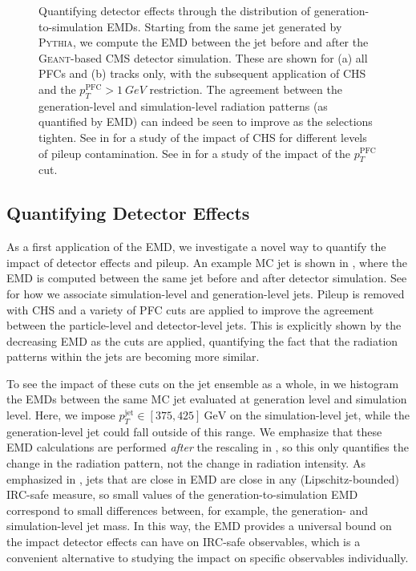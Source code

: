 \documentclass[aps,prd,twocolumn,preprintnumbers,nofootinbib,longbibliography,floatfix,superscriptaddress]{revtex4-1}
\begin{document}
\begin{figure*}[t]
  \caption{
Quantifying detector effects through the distribution of generation-to-simulation EMDs.
%
Starting from the same jet generated by \textsc{Pythia}, we compute the EMD between the jet before and after the \textsc{Geant}-based CMS detector simulation.
%
These are shown for (a) all PFCs and (b) tracks only, with the subsequent application of CHS and the $p_T^\text{PFC} > \SI{1}{GeV}$ restriction.
%
The agreement between the generation-level and simulation-level radiation patterns (as quantified by EMD) can indeed be seen to improve as the selections tighten.
%
See  in  for a study of the impact of CHS for different levels of pileup contamination.
%
See  in  for a study of the impact of the $p_T^\text{PFC}$ cut.
}
  \label{fig:emdcmp}
\end{figure*}


\subsection{Quantifying Detector Effects}
\label{subsec:emd_detector}


As a first application of the EMD, we investigate a novel way to quantify the impact of detector effects and pileup.
%
An example MC jet is shown in , where the EMD is computed between the same jet before and after detector simulation.
%
See  for how we associate simulation-level and generation-level jets.
%
Pileup is removed with CHS and a variety of PFC cuts are applied to improve the agreement between the particle-level and detector-level jets.
%
This is explicitly shown by the decreasing EMD as the cuts are applied, quantifying the fact that the radiation patterns within the jets are becoming more similar.


To see the impact of these cuts on the jet ensemble as a whole, in  we histogram the EMDs between the same MC jet evaluated at generation level and simulation level.
%
Here, we impose $p_T^\text{jet} \in [375,425]~\text{GeV}$ on the simulation-level jet, while the generation-level jet could fall outside of this range.
%
We emphasize that these EMD calculations are performed \emph{after} the rescaling in , so this only quantifies the change in the radiation pattern, not the change in radiation intensity.
%
As emphasized in , jets that are close in EMD are close in any (Lipschitz-bounded) IRC-safe measure, so small values of the generation-to-simulation EMD correspond to small differences between, for example, the generation- and simulation-level jet mass.
%
In this way, the EMD provides a universal bound on the impact detector effects can have on IRC-safe observables, which is a convenient alternative to studying the impact on specific observables individually.
\end{document}
